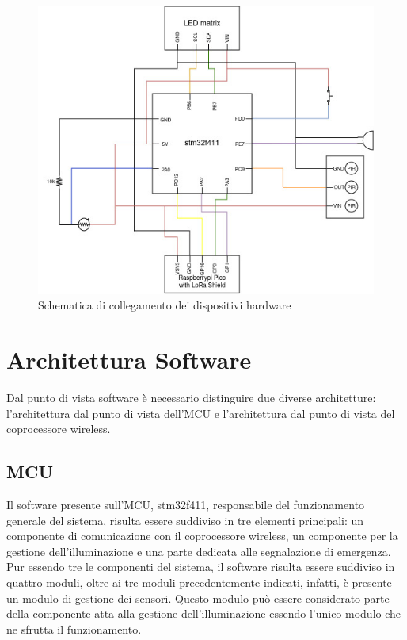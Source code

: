 \documentclass{article}
\begin{document}
	\begin{figure}[ht]
		\centering
		\includegraphics[scale=0.50]{./images/Hardware_schematic.jpg}
		\caption{Schematica di collegamento dei dispositivi hardware}
		\label{img:hw}
	\end{figure}
	\newpage
	
	\section{Architettura Software}
	Dal punto di vista software \`e necessario distinguire due diverse architetture: l'architettura dal punto di vista dell'MCU e l'architettura dal punto di vista del coprocessore wireless.
	
	\subsection{MCU}
	Il software presente sull'MCU, stm32f411, responsabile del funzionamento generale del sistema, risulta essere suddiviso in tre elementi principali: un componente di comunicazione con il coprocessore wireless, un componente per la gestione dell'illuminazione e una parte dedicata alle segnalazione di emergenza.
	Pur essendo tre le componenti del sistema, il software risulta essere suddiviso in quattro moduli, oltre ai tre moduli precedentemente indicati, infatti, \`e presente un modulo di gestione dei sensori. Questo modulo pu\`o essere considerato parte della componente atta alla gestione dell'illuminazione essendo l'unico modulo che ne sfrutta il funzionamento.
	
\end{document}
